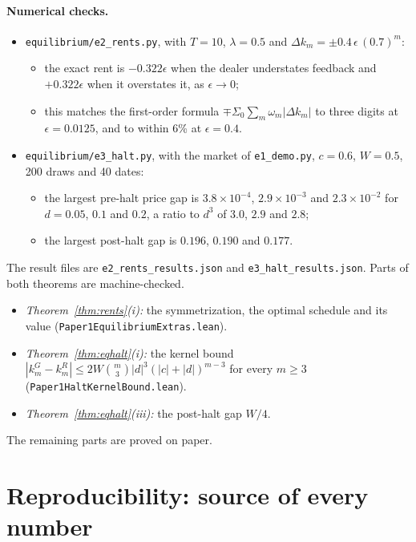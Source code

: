 \documentclass[12pt]{article}
\theoremstyle{definition}
\theoremstyle{remark}
\begin{document}
\paragraph{Numerical checks.}
\begin{itemize}[itemsep=1pt,topsep=2pt]
\item \nolinkurl{equilibrium/e2_rents.py}, with $T=10$, $\lambda=0.5$ and $\Delta k_m=\pm0.4\,\epsilon\,(0.7)^m$:
  \begin{itemize}[itemsep=1pt,topsep=1pt]
  \item the exact rent is $-0.322\epsilon$ when the dealer understates feedback and $+0.322\epsilon$ when it overstates it, as $\epsilon\to0$;
  \item this matches the first-order formula $\mp\Sigma_0\sum_m\omega_m|\Delta k_m|$ to three digits at $\epsilon=0.0125$, and to within 6\% at $\epsilon=0.4$.
  \end{itemize}
\item \nolinkurl{equilibrium/e3_halt.py}, with the market of \nolinkurl{e1_demo.py}, $c=0.6$, $W=0.5$, 200 draws and 40 dates:
  \begin{itemize}[itemsep=1pt,topsep=1pt]
  \item the largest pre-halt price gap is $3.8\times10^{-4}$, $2.9\times10^{-3}$ and $2.3\times10^{-2}$ for $d=0.05$, $0.1$ and $0.2$, a ratio to $d^3$ of $3.0$, $2.9$ and $2.8$;
  \item the largest post-halt gap is $0.196$, $0.190$ and $0.177$.
  \end{itemize}
\end{itemize}
The result files are \nolinkurl{e2_rents_results.json} and \nolinkurl{e3_halt_results.json}. Parts of both theorems are machine-checked.
\begin{itemize}[itemsep=1pt,topsep=2pt]
\item \emph{Theorem~\ref{thm:rents}(i):} the symmetrization, the optimal schedule and its value (\nolinkurl{Paper1EquilibriumExtras.lean}).
\item \emph{Theorem~\ref{thm:eqhalt}(i):} the kernel bound $|k^G_m-k^R_m|\le2W\binom m3|d|^3(|c|+|d|)^{m-3}$ for every $m\ge3$ (\nolinkurl{Paper1HaltKernelBound.lean}).
\item \emph{Theorem~\ref{thm:eqhalt}(iii):} the post-halt gap $W/4$.
\end{itemize}
The remaining parts are proved on paper.



\section{Reproducibility: source of every number}\label{app:repro}
\end{document}

